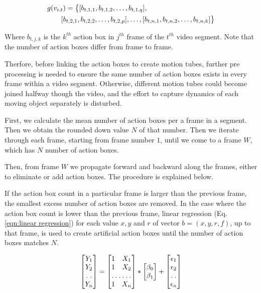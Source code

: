 \begin{equation}
\label{eqn:action box}
\begin{split}
\MoveEqLeft
 g(v_{i,t}) = \big\{[b_{t,1,1},b_{t,1,2},\dots,b_{t,1,q}],\\
 & [b_{t,2,1},b_{t,2,2},\dots,b_{t,2,p}],\dots,[b_{t,n,1},b_{t,n,2},\dots,b_{t,n,k}]\big\}
\end{split}
\end{equation}

Where $b_{t,j,k}$ is the $k^{th}$ action box in $j^{th}$ frame of the $t^{th}$ video segment. Note that the number of
action boxes differ from frame to frame.

Therfore, before linking the action boxes to create motion tubes, further pre processing is needed to ensure the same number of action
boxes exists in every frame within a video segment. Otherwise, different motion tubes could become joined halfway though the video, and the
effort to capture dynamics of each moving object separately is disturbed.

First, we calculate the mean number of action boxes per a frame in a segment. Then we obtain the rounded down value $N$ of that number.
Then we iterate through each frame, starting from frame number $1$, until we come to a frame $W$, which has $N$ number of action boxes.

Then, from frame $W$ we propagate forward and backward along the frames, either to eliminate or add action boxes. The procedure is explained
below.

If the action box count in a particular frame is larger than the previous frame, the smallest excess number of action boxes are removed.
In the case where the action box count is lower than the previous frame, linear regression (Eq. \ref{eqn:linear regression}) for each value $x,y$ and $r$ of vector $b = (x,y,r,f)$,
up to that frame, is used to create artificial action boxes until the number of action boxes matches $N$.

\begin{equation}
\label{eqn:linear regression}
\begin{bmatrix}
    Y_{1}     \\
    Y_{2}     \\
    \hdotsfor{1} \\
    Y_{n}
\end{bmatrix}
=
\begin{bmatrix}
    1 & X_{1}     \\
    1 & X_{2}     \\
    \hdotsfor{2} \\
    1 & X_{n}
\end{bmatrix}
*
\begin{bmatrix}
    \beta_{0}     \\
    \beta_{1}
\end{bmatrix}
+
\begin{bmatrix}
    \epsilon_{1}     \\
    \epsilon_{2}    \\
    \hdotsfor{1} \\
    \epsilon_{n}
\end{bmatrix}
\end{equation}

